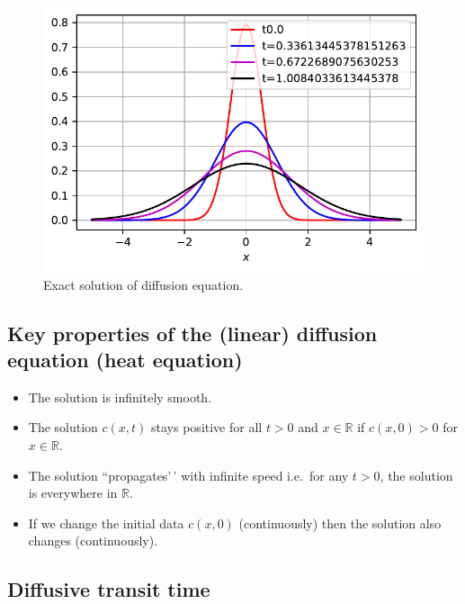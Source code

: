 \documentclass[
  letterpaper,
  DIV=11,
  numbers=noendperiod]{scrreprt}
\providecommand{\tightlist}{%
  \setlength{\itemsep}{0pt}\setlength{\parskip}{0pt}}\usepackage{longtable,booktabs,array}
\theoremstyle{plain}
\theoremstyle{definition}
\theoremstyle{plain}
\theoremstyle{remark}
\begin{document}
\begin{figure}

{\centering \includegraphics{linearreactiondiffusion_files/figure-pdf/fig-diffusionpde-output-2.pdf}

}

\caption{\label{fig-diffusionpde}Exact solution of diffusion equation.}

\end{figure}

\hypertarget{key-properties-of-the-linear-diffusion-equation-heat-equation}{%
\subsection{Key properties of the (linear) diffusion equation (heat
equation)}\label{key-properties-of-the-linear-diffusion-equation-heat-equation}}

\begin{itemize}
\tightlist
\item
  The solution is infinitely smooth.
\item
  The solution \(c(x,t)\) stays positive for all \(t >0\) and
  \(x \in \mathbb R\) if \(c(x,0) >0\) for \(x \in \mathbb R\).
\item
  The solution ``propagates'\,' with infinite speed i.e.~for any
  \(t > 0\), the solution is everywhere in \(\mathbb R\).
\item
  If we change the initial data \(c(x,0)\) (continuously) then the
  solution also changes (continuously).
\end{itemize}

\hypertarget{diffusive-transit-time}{%
\subsection{Diffusive transit time}\label{diffusive-transit-time}}
\end{document}
